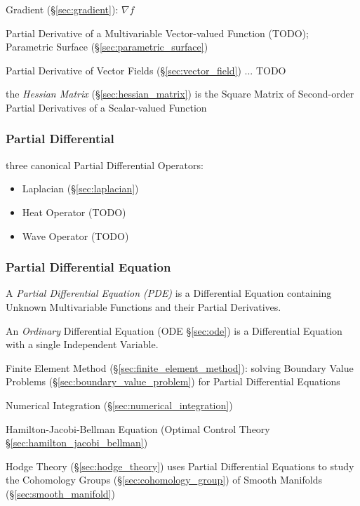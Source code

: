 Gradient (\S\ref{sec:gradient}): $\nabla f$

Partial Derivative of a Multivariable Vector-valued Function (TODO); Parametric
Surface (\S\ref{sec:parametric_surface})

Partial Derivative of Vector Fields (\S\ref{sec:vector_field}) ... TODO

the \emph{Hessian Matrix} (\S\ref{sec:hessian_matrix}) is the Square Matrix of
Second-order Partial Derivatives of a Scalar-valued Function



\subsubsection{Partial Differential}\label{sec:partial_differential}

three canonical Partial Differential Operators:
\begin{itemize}
  \item Laplacian (\S\ref{sec:laplacian})
  \item Heat Operator (TODO)
  \item Wave Operator (TODO)
\end{itemize}



\subsubsection{Partial Differential Equation}\label{sec:pde}

A \emph{Partial Differential Equation (PDE)} is a Differential Equation
containing Unknown Multivariable Functions and their Partial Derivatives.

\fist An \emph{Ordinary} Differential Equation (ODE \S\ref{sec:ode}) is a
Differential Equation with a single Independent Variable.

Finite Element Method (\S\ref{sec:finite_element_method}): solving
Boundary Value Problems (\S\ref{sec:boundary_value_problem}) for
Partial Differential Equations

\fist Numerical Integration (\S\ref{sec:numerical_integration})

\fist Hamilton-Jacobi-Bellman Equation (Optimal Control Theory
\S\ref{sec:hamilton_jacobi_bellman})

\fist Hodge Theory (\S\ref{sec:hodge_theory}) uses Partial Differential
Equations to study the Cohomology Groups (\S\ref{sec:cohomology_group}) of
Smooth Manifolds (\S\ref{sec:smooth_manifold})



